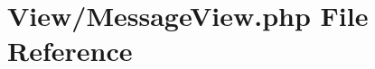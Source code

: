 \hypertarget{_message_view_8php}{}\section{View/\+Message\+View.php File Reference}
\label{_message_view_8php}
